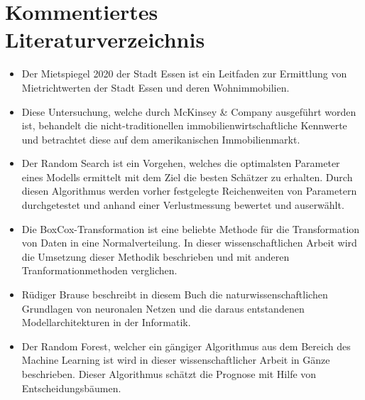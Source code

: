 \section{Kommentiertes Literaturverzeichnis}
\begin{itemize}
    \item Der Mietspiegel 2020 der Stadt Essen ist ein Leitfaden zur 
    Ermittlung von Mietrichtwerten der Stadt Essen und deren 
    Wohnimmobilien.
\end{itemize}

\begin{itemize}
    \item Diese Untersuchung, welche durch McKinsey \& Company ausgeführt
    worden ist, behandelt die nicht-traditionellen immobilienwirtschaftliche
    Kennwerte und betrachtet diese auf dem amerikanischen Immobilienmarkt. 
\end{itemize}

\begin{itemize}
    \item Der Random Search ist ein Vorgehen, welches die optimalsten
    Parameter eines Modells ermittelt mit dem Ziel die besten Schätzer
    zu erhalten. Durch diesen Algorithmus werden vorher festgelegte
    Reichenweiten von Parametern durchgetestet und anhand einer
    Verlustmessung bewertet und auserwählt.
\end{itemize}
\newpage
{}
\begin{itemize}
    \item Die BoxCox-Transformation ist eine beliebte Methode für die
    Transformation von Daten in eine Normalverteilung. In dieser
    wissenschaftlichen Arbeit wird die Umsetzung dieser Methodik 
    beschrieben und mit anderen Tranformationmethoden verglichen.
\end{itemize}

\begin{itemize}
    \item Rüdiger Brause beschreibt in diesem Buch die 
    naturwissenschaftlichen Grundlagen von neuronalen Netzen und 
    die daraus entstandenen Modellarchitekturen in der Informatik.
\end{itemize}

\begin{itemize}
    \item Der Random Forest, welcher ein gängiger Algorithmus aus 
    dem Bereich des Machine Learning ist wird in dieser 
    wissenschaftlicher Arbeit in Gänze beschrieben. Dieser Algorithmus 
    schätzt die Prognose mit Hilfe von Entscheidungsbäumen.
\end{itemize}

